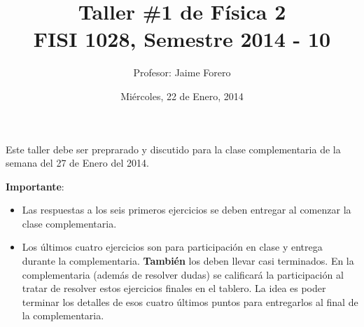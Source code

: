 \documentclass{article}
\title{Taller \#1 de F\'isica 2\\ FISI 1028, Semestre 2014 - 10}
\author{Profesor: Jaime Forero}
\date{Mi\'ercoles, 22 de Enero, 2014}
\begin{document}
\maketitle
\thispagestyle{empty}

\noindent
Este taller debe ser preprarado y discutido para la clase
complementaria de la semana del 27 de Enero del 2014. 

\noindent
{\bf Importante}:
\begin{itemize}
\item
Las respuestas a los seis primeros ejercicios se deben entregar al comenzar la
clase complementaria. 
\item 
Los \'ultimos cuatro ejercicios son para participaci\'on en clase y entrega
durante la complementaria. {\bf{Tambi\'en}} los deben llevar casi
terminados. En la complementaria (adem\'as de resolver dudas) se
calificar\'a la participaci\'on al tratar de resolver estos ejercicios
finales en el tablero. La idea es poder terminar los  detalles de esos
cuatro \'ultimos puntos para entregarlos al final de la complementaria.
\end{itemize}
\end{document}
